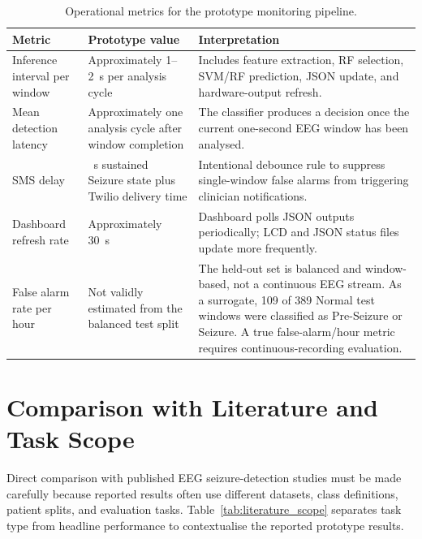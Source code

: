 \documentclass[12pt, a4paper]{report}
\begin{document}
\begin{table}[H]
  \centering
  \caption{Operational metrics for the prototype monitoring pipeline.}
  \label{tab:operational_metrics}
  \small
  \renewcommand{\arraystretch}{1.15}
  \begin{tabularx}{\textwidth}{>{\raggedright\arraybackslash}p{4.2cm}
                              >{\raggedright\arraybackslash}p{3.8cm}
                              >{\raggedright\arraybackslash}X}
    \toprule
    \textbf{Metric} & \textbf{Prototype value} & \textbf{Interpretation} \\
    \midrule
    Inference interval per window &
    Approximately 1--2~s per analysis cycle &
    Includes feature extraction, RF selection, SVM/RF prediction, JSON
    update, and hardware-output refresh. \\
    Mean detection latency &
    Approximately one analysis cycle after window completion &
    The classifier produces a decision once the current one-second EEG
    window has been analysed. \\
    SMS delay &
    30~s sustained Seizure state plus Twilio delivery time &
    Intentional debounce rule to suppress single-window false alarms from
    triggering clinician notifications. \\
    Dashboard refresh rate &
    Approximately 30~s &
    Dashboard polls JSON outputs periodically; LCD and JSON status files
    update more frequently. \\
    False alarm rate per hour &
    Not validly estimated from the balanced test split &
    The held-out set is balanced and window-based, not a continuous EEG
    stream. As a surrogate, 109 of 389 Normal test windows were classified
    as Pre-Seizure or Seizure. A true false-alarm/hour metric requires
    continuous-recording evaluation. \\
    \bottomrule
  \end{tabularx}
\end{table}

\section{Comparison with Literature and Task Scope}

Direct comparison with published EEG seizure-detection studies must be
made carefully because reported results often use different datasets, class
definitions, patient splits, and evaluation tasks. Table~\ref{tab:literature_scope}
separates task type from headline performance to contextualise the reported
prototype results.
\end{document}
